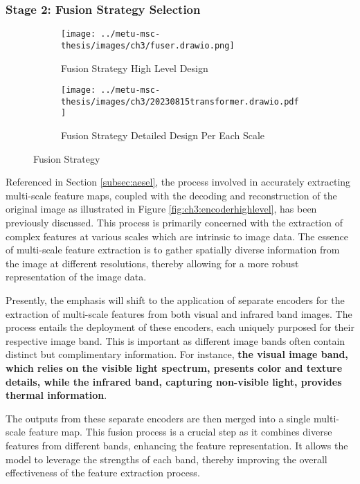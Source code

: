 \subsubsection{Stage 2: Fusion Strategy Selection} \label{subsec:fusion}

\begin{figure}[htbp]
    \begin{subfigure}[b]{\textwidth}
        \centering
        \texttt{[image: ../metu-msc-thesis/images/ch3/fuser.drawio.png]}
        \caption{Fusion Strategy High Level Design}
        \label{fig:ch3:fusionhighlevel}
    \end{subfigure}
    \begin{subfigure}[b]{\textwidth}
        \centering
        \texttt{[image: ../metu-msc-thesis/images/ch3/20230815transformer.drawio.pdf]}
        \caption{Fusion Strategy Detailed Design Per Each Scale}
        \label{fig:ch3:fusiondetailed}
    \end{subfigure}
    \caption{Fusion Strategy}
    \label{fig:ch3:fusion}
\end{figure}

Referenced in Section \ref{subsec:aesel}, the process involved in accurately extracting multi-scale feature maps, coupled with the decoding and reconstruction of the original image as illustrated in Figure \ref{fig:ch3:encoderhighlevel}, has been previously discussed. This process is primarily concerned with the extraction of complex features at various scales which are intrinsic to image data. The essence of multi-scale feature extraction is to gather spatially diverse information from the image at different resolutions, thereby allowing for a more robust representation of the image data.

Presently, the emphasis will shift to the application of separate encoders for the extraction of multi-scale features from both visual and infrared band images. The process entails the deployment of these encoders, each uniquely purposed for their respective image band. This is important as different image bands often contain distinct but complimentary information. For instance, \textbf{the visual image band, which relies on the visible light spectrum, presents color and texture details, while the infrared band, capturing non-visible light, provides thermal information}.

The outputs from these separate encoders are then merged into a single multi-scale feature map. This fusion process is a crucial step as it combines diverse features from different bands, enhancing the feature representation. It allows the model to leverage the strengths of each band, thereby improving the overall effectiveness of the feature extraction process.

